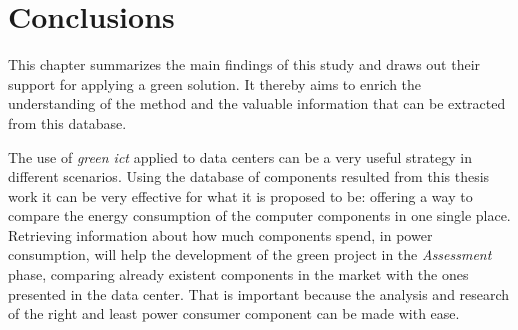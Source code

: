 

\chapter{Conclusions} \label{conclusion}





    This chapter summarizes the main findings of this study and draws out their support for applying a green solution. It thereby aims to enrich the understanding of the method and the valuable information that can be extracted from this database. 
    
    The use of \emph{green ict} applied to data centers can be a very useful strategy in different scenarios. Using the database of components resulted from this thesis work it can be very effective for what it is proposed to be: offering a way to compare the energy consumption of the computer components in one single place. Retrieving information about how much components spend, in power consumption, will help the development of the green project in the \emph{Assessment} phase, comparing already existent components in the market with the ones presented in the data center. That is important because the analysis and research of the right and least power consumer component can be made with ease.
    
